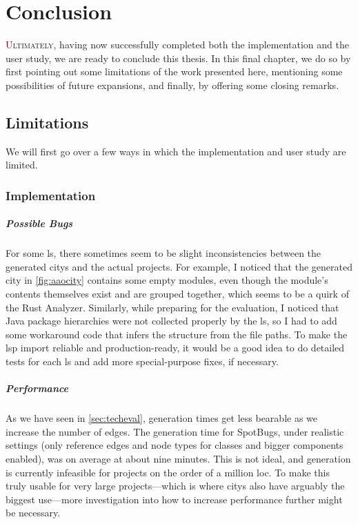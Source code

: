 \documentclass[../thesis]{subfiles}
\begin{document}
\chapter{Conclusion}\label{ch:conclusion}

\lettrine[lines=3]{\textcolor{Maroon}{U}}{ltimately}, having now successfully completed both the implementation and the user study, we are ready to conclude this thesis.
In this final chapter, we do so by first pointing out some limitations of the work presented here, mentioning some possibilities of future expansions, and finally, by offering some closing remarks.

\setlength\parskip{0.1\baselineskip plus 2pt}

\section{Limitations}
We will first go over a few ways in which the implementation and user study are limited.

\subsection{Implementation}
\paragraph{Possible Bugs}
For some \gls{ls}, there sometimes seem to be slight inconsistencies between the generated \glspl{city} and the actual projects.
For example, I noticed that the generated city in \cref{fig:aaocity} contains some empty modules, even though the module's contents themselves exist and are grouped together, which seems to be a quirk of the Rust Analyzer.
Similarly, while preparing \SEE{} for the evaluation, I noticed that Java package hierarchies were not collected properly by the \gls{ls}, so I had to add some workaround code that infers the structure from the file paths.
To make the \gls{lsp} import reliable and production-ready, it would be a good idea to do detailed tests for each \gls{ls} and add more special-purpose fixes, if necessary.

\paragraph{Performance}
As we have seen in \cref{sec:techeval}, generation times get less bearable as we increase the number of edges.
The generation time for SpotBugs, under realistic settings (only reference edges and node types for classes and bigger components enabled), was on average at about nine minutes.
This is not ideal, and generation is currently infeasible for projects on the order of a million \gls{loc}.
To make this truly usable for very large projects---which is where \glspl{city} also have arguably the biggest use---more investigation into how to increase performance further might be necessary.
\end{document}
